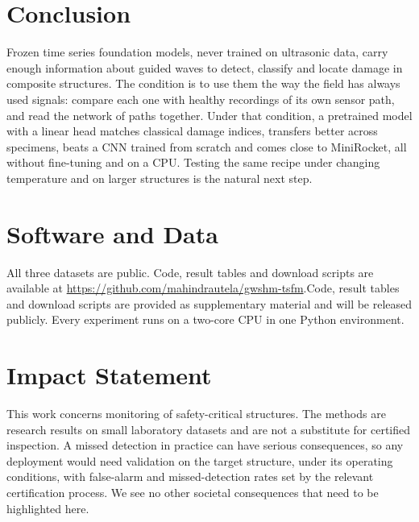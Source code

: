 \documentclass{article}
\begin{document}
\section{Conclusion}
\label{sec:conclusion}

Frozen time series foundation models, never trained on ultrasonic data, carry enough information about
guided waves to detect, classify and locate damage in composite structures. The condition is to use them
the way the field has always used signals: compare each one with healthy recordings of its own sensor
path, and read the network of paths together. Under that condition, a pretrained model with a linear
head matches classical damage indices, transfers better across specimens, beats a CNN trained from
scratch and comes close to MiniRocket, all without fine-tuning and on a CPU. Testing the same recipe under changing temperature and on larger
structures is the natural next step.

\section*{Software and Data}
All three datasets are public. \ificmlshowauthors Code, result tables and download scripts are available at
\url{https://github.com/mahindrautela/gwshm-tsfm}.\else Code, result tables and download scripts are
provided as supplementary material and will be released publicly.\fi{} Every experiment runs on a two-core
CPU in one Python environment.

\section*{Impact Statement}
This work concerns monitoring of safety-critical structures. The methods are research results on small
laboratory datasets and are not a substitute for certified inspection. A missed detection in practice can
have serious consequences, so any deployment would need validation on the target structure, under its
operating conditions, with false-alarm and missed-detection rates set by the relevant certification
process. We see no other societal consequences that need to be highlighted here.




\newpage
\appendix
\onecolumn
\end{document}
